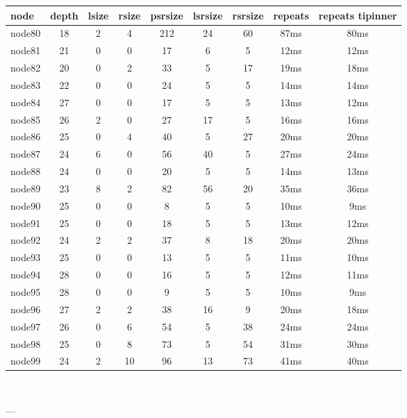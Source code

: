 \begin{tabular}{|l|c|c|c|c|c|c|c|c|}
\hline node & depth & lsize & rsize & psrsize & lsrsize & rsrsize   & repeats & repeats tipinner\\
    \hline node80 & 18 & 2 & 4 & 212 & 24 & 60 & 87ms & 80ms\\
    \hline node81 & 21 & 0 & 0 & 17 & 6 & 5 & 12ms & 12ms\\
    \hline node82 & 20 & 0 & 2 & 33 & 5 & 17 & 19ms & 18ms\\
    \hline node83 & 22 & 0 & 0 & 24 & 5 & 5 & 14ms & 14ms\\
    \hline node84 & 27 & 0 & 0 & 17 & 5 & 5 & 13ms & 12ms\\
    \hline node85 & 26 & 2 & 0 & 27 & 17 & 5 & 16ms & 16ms\\
    \hline node86 & 25 & 0 & 4 & 40 & 5 & 27 & 20ms & 20ms\\
    \hline node87 & 24 & 6 & 0 & 56 & 40 & 5 & 27ms & 24ms\\
    \hline node88 & 24 & 0 & 0 & 20 & 5 & 5 & 14ms & 13ms\\
    \hline node89 & 23 & 8 & 2 & 82 & 56 & 20 & 35ms & 36ms\\
    \hline node90 & 25 & 0 & 0 & 8 & 5 & 5 & 10ms & 9ms\\
    \hline node91 & 25 & 0 & 0 & 18 & 5 & 5 & 13ms & 12ms\\
    \hline node92 & 24 & 2 & 2 & 37 & 8 & 18 & 20ms & 20ms\\
    \hline node93 & 25 & 0 & 0 & 13 & 5 & 5 & 11ms & 10ms\\
    \hline node94 & 28 & 0 & 0 & 16 & 5 & 5 & 12ms & 11ms\\
    \hline node95 & 28 & 0 & 0 & 9 & 5 & 5 & 10ms & 9ms\\
    \hline node96 & 27 & 2 & 2 & 38 & 16 & 9 & 20ms & 18ms\\
    \hline node97 & 26 & 0 & 6 & 54 & 5 & 38 & 24ms & 24ms\\
    \hline node98 & 25 & 0 & 8 & 73 & 5 & 54 & 31ms & 30ms\\
    \hline node99 & 24 & 2 & 10 & 96 & 13 & 73 & 41ms & 40ms\\

\hline
\end{tabular} \

---


